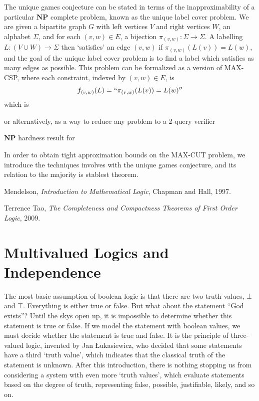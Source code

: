 The unique games conjecture can be stated in terms of the inapproximability of a particular $\mathbf{NP}$ complete problem, known as the unique label cover problem. We are given a bipartite graph $G$ with left vertices $V$ and right vertices $W$, an alphabet $\Sigma$, and for each $(v,w) \in E$, a bijection $\pi_{(v,w)}: \Sigma \to \Sigma$. A labelling $L: (V \cup W) \to \Sigma$ then `satisfies' an edge $(v,w)$ if $\pi_{(v,w)}(L(v)) = L(w)$, and the goal of the unique label cover problem is to find a label which satisfies as many edges as possible. This problem can be formalized as a version of MAX-CSP, where each constraint, indexed by $(v,w) \in E$, is
%
\[ f_{(v,w)}(L) = ``\pi_{(v,w)}(L(v)) = L(w)'' \]
%
which is 

or alternatively, as a way to reduce any problem to a 2-query verifier

$\mathbf{NP}$ hardness result for 

In order to obtain tight approximation bounds on the MAX-CUT problem, we introduce the techniques involves with the unique games conjecture, and its relation to the majority is stablest theorem.

\begin{thebibliography}{9}

    Mendelson,
    \emph{Introduction to Mathematical Logic},
    Chapman and Hall,
    1997.

    Terrence Tao,
    \emph{The Completeness and Compactness Theorems of First Order Logic},
    2009.

\end{thebibliography}



















\section{Multivalued Logics and Independence}

The most basic assumption of boolean logic is that there are two truth values, $\bot$ and $\top$. Everything is either true or false. But what about the statement ``God exists''? Until the skys open up, it is impossible to determine whether this statement is true or false. If we model the statement with boolean values, we must decide whether the statement is true and false. It is the principle of three-valued logic, invented by Jan \L ukasiewicz, who decided that some statements have a third `truth value', which indicates that the classical truth of the statement is unknown. After this introduction, there is nothing stopping us from considering a system with even more `truth values', which evaluate statements based on the degree of truth, representing false, possible, justifiable, likely, and so on.


